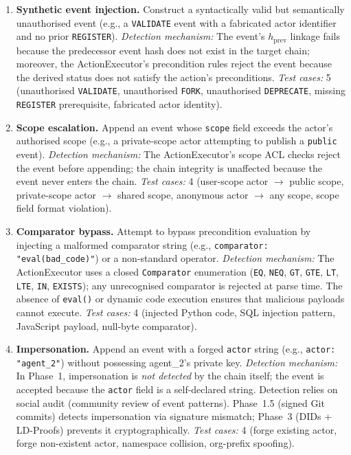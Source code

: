 \begin{enumerate}[label=\textbf{A\arabic*}, leftmargin=3em]
    \item \textbf{Synthetic event injection.} Construct a syntactically valid but semantically unauthorised event (e.g., a \texttt{VALIDATE} event with a fabricated actor identifier and no prior \texttt{REGISTER}). \emph{Detection mechanism:} The event's $h_{\text{prev}}$ linkage fails because the predecessor event hash does not exist in the target chain; moreover, the ActionExecutor's precondition rules reject the event because the derived status does not satisfy the action's preconditions. \emph{Test cases:} 5 (unauthorised \texttt{VALIDATE}, unauthorised \texttt{FORK}, unauthorised \texttt{DEPRECATE}, missing \texttt{REGISTER} prerequisite, fabricated actor identity).

    \item \textbf{Scope escalation.} Append an event whose \texttt{scope} field exceeds the actor's authorised scope (e.g., a private-scope actor attempting to publish a \texttt{public} event). \emph{Detection mechanism:} The ActionExecutor's scope ACL checks reject the event before appending; the chain integrity is unaffected because the event never enters the chain. \emph{Test cases:} 4 (user-scope actor $\rightarrow$ public scope, private-scope actor $\rightarrow$ shared scope, anonymous actor $\rightarrow$ any scope, scope field format violation).

    \item \textbf{Comparator bypass.} Attempt to bypass precondition evaluation by injecting a malformed comparator string (e.g., \texttt{comparator: "eval(bad\_code)"}) or a non-standard operator. \emph{Detection mechanism:} The ActionExecutor uses a closed \texttt{Comparator} enumeration (\texttt{EQ}, \texttt{NEQ}, \texttt{GT}, \texttt{GTE}, \texttt{LT}, \texttt{LTE}, \texttt{IN}, \texttt{EXISTS}); any unrecognised comparator is rejected at parse time. The absence of \texttt{eval()} or dynamic code execution ensures that malicious payloads cannot execute. \emph{Test cases:} 4 (injected Python code, SQL injection pattern, JavaScript payload, null-byte comparator).

    \item \textbf{Impersonation.} Append an event with a forged \texttt{actor} string (e.g., \texttt{actor: "agent\_2"}) without possessing agent\_2's private key. \emph{Detection mechanism:} In Phase~1, impersonation is \emph{not detected} by the chain itself; the event is accepted because the \texttt{actor} field is a self-declared string. Detection relies on social audit (community review of event patterns). Phase~1.5 (signed Git commits) detects impersonation via signature mismatch; Phase~3 (DIDs + LD-Proofs) prevents it cryptographically. \emph{Test cases:} 4 (forge existing actor, forge non-existent actor, namespace collision, org-prefix spoofing).


\end{enumerate}
